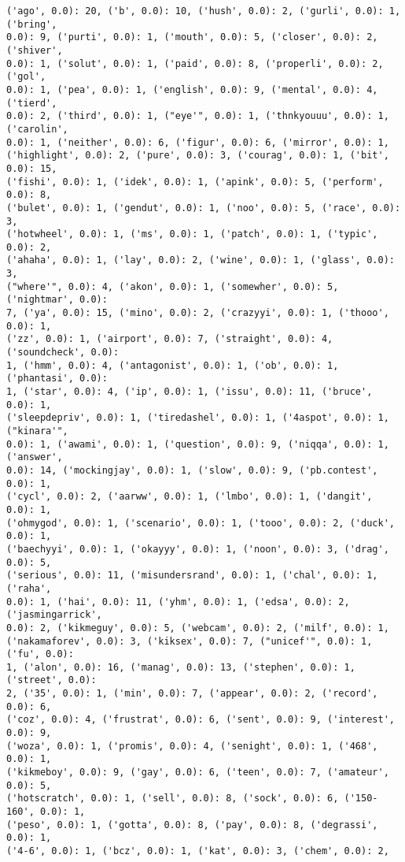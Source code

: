 \documentclass[11pt]{article}
\begin{document}
\begin{Verbatim}[commandchars=\\\{\}]
('ago', 0.0): 20, ('b', 0.0): 10, ('hush', 0.0): 2, ('gurli', 0.0): 1, ('bring',
0.0): 9, ('purti', 0.0): 1, ('mouth', 0.0): 5, ('closer', 0.0): 2, ('shiver',
0.0): 1, ('solut', 0.0): 1, ('paid', 0.0): 8, ('properli', 0.0): 2, ('gol',
0.0): 1, ('pea', 0.0): 1, ('english', 0.0): 9, ('mental', 0.0): 4, ('tierd',
0.0): 2, ('third', 0.0): 1, ("eye'", 0.0): 1, ('thnkyouuu', 0.0): 1, ('carolin',
0.0): 1, ('neither', 0.0): 6, ('figur', 0.0): 6, ('mirror', 0.0): 1,
('highlight', 0.0): 2, ('pure', 0.0): 3, ('courag', 0.0): 1, ('bit', 0.0): 15,
('fishi', 0.0): 1, ('idek', 0.0): 1, ('apink', 0.0): 5, ('perform', 0.0): 8,
('bulet', 0.0): 1, ('gendut', 0.0): 1, ('noo', 0.0): 5, ('race', 0.0): 3,
('hotwheel', 0.0): 1, ('ms', 0.0): 1, ('patch', 0.0): 1, ('typic', 0.0): 2,
('ahaha', 0.0): 1, ('lay', 0.0): 2, ('wine', 0.0): 1, ('glass', 0.0): 3,
("where'", 0.0): 4, ('akon', 0.0): 1, ('somewher', 0.0): 5, ('nightmar', 0.0):
7, ('ya', 0.0): 15, ('mino', 0.0): 2, ('crazyyi', 0.0): 1, ('thooo', 0.0): 1,
('zz', 0.0): 1, ('airport', 0.0): 7, ('straight', 0.0): 4, ('soundcheck', 0.0):
1, ('hmm', 0.0): 4, ('antagonist', 0.0): 1, ('ob', 0.0): 1, ('phantasi', 0.0):
1, ('star', 0.0): 4, ('ip', 0.0): 1, ('issu', 0.0): 11, ('bruce', 0.0): 1,
('sleepdepriv', 0.0): 1, ('tiredashel', 0.0): 1, ('4aspot', 0.0): 1, ("kinara'",
0.0): 1, ('awami', 0.0): 1, ('question', 0.0): 9, ('niqqa', 0.0): 1, ('answer',
0.0): 14, ('mockingjay', 0.0): 1, ('slow', 0.0): 9, ('pb.contest', 0.0): 1,
('cycl', 0.0): 2, ('aarww', 0.0): 1, ('lmbo', 0.0): 1, ('dangit', 0.0): 1,
('ohmygod', 0.0): 1, ('scenario', 0.0): 1, ('tooo', 0.0): 2, ('duck', 0.0): 1,
('baechyyi', 0.0): 1, ('okayyy', 0.0): 1, ('noon', 0.0): 3, ('drag', 0.0): 5,
('serious', 0.0): 11, ('misundersrand', 0.0): 1, ('chal', 0.0): 1, ('raha',
0.0): 1, ('hai', 0.0): 11, ('yhm', 0.0): 1, ('edsa', 0.0): 2, ('jasmingarrick',
0.0): 2, ('kikmeguy', 0.0): 5, ('webcam', 0.0): 2, ('milf', 0.0): 1,
('nakamaforev', 0.0): 3, ('kiksex', 0.0): 7, ("unicef'", 0.0): 1, ('fu', 0.0):
1, ('alon', 0.0): 16, ('manag', 0.0): 13, ('stephen', 0.0): 1, ('street', 0.0):
2, ('35', 0.0): 1, ('min', 0.0): 7, ('appear', 0.0): 2, ('record', 0.0): 6,
('coz', 0.0): 4, ('frustrat', 0.0): 6, ('sent', 0.0): 9, ('interest', 0.0): 9,
('woza', 0.0): 1, ('promis', 0.0): 4, ('senight', 0.0): 1, ('468', 0.0): 1,
('kikmeboy', 0.0): 9, ('gay', 0.0): 6, ('teen', 0.0): 7, ('amateur', 0.0): 5,
('hotscratch', 0.0): 1, ('sell', 0.0): 8, ('sock', 0.0): 6, ('150-160', 0.0): 1,
('peso', 0.0): 1, ('gotta', 0.0): 8, ('pay', 0.0): 8, ('degrassi', 0.0): 1,
('4-6', 0.0): 1, ('bcz', 0.0): 1, ('kat', 0.0): 3, ('chem', 0.0): 2,

\end{Verbatim}
\end{document}
